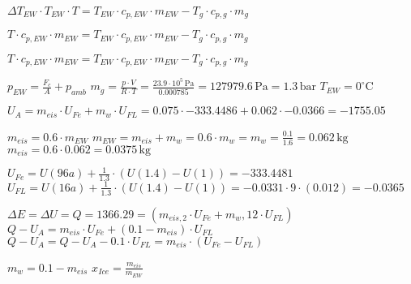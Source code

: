 \( \Delta T_{EW} \cdot T_{EW} \cdot T = T_{EW} \cdot c_{p,EW} \cdot m_{EW} - T_{g} \cdot c_{p,g} \cdot m_g \)  

\( T \cdot c_{p,EW} \cdot m_{EW} = T_{EW} \cdot c_{p,EW} \cdot m_{EW} - T_{g} \cdot c_{p,g} \cdot m_g \)  

\( T \cdot c_{p,EW} \cdot m_{EW} = T_{EW} \cdot c_{p,EW} \cdot m_{EW} - T_{g} \cdot c_{p,g} \cdot m_g \)

\( p_{EW} = \frac{F_c}{A} + p_{amb} \)  
\( m_g = \frac{p \cdot V}{R \cdot T} = \frac{23.9 \cdot 10^5 \, \text{Pa}}{0.000785} = 127979.6 \, \text{Pa} = 1.3 \, \text{bar} \)  
\( T_{EW} = 0^\circ \text{C} \)  

\( U_A = m_{eis} \cdot U_{Fe} + m_w \cdot U_{FL} = 0.075 \cdot -333.4486 + 0.062 \cdot -0.0366 = -1755.05 \)  

\( m_{eis} = 0.6 \cdot m_{EW} \)  
\( m_{EW} = m_{eis} + m_w = 0.6 \cdot m_w = m_w = \frac{0.1}{1.6} = 0.062 \, \text{kg} \)  
\( m_{eis} = 0.6 \cdot 0.062 = 0.0375 \, \text{kg} \)  

\( U_{Fe} = U(96a) + \frac{1}{1.3} \cdot (U(1.4) - U(1)) = -333.4481 \)  
\( U_{FL} = U(16a) + \frac{1}{1.3} \cdot (U(1.4) - U(1)) = -0.0331 \cdot 9 \cdot (0.012) = -0.0365 \)  

\( \Delta E = \Delta U = Q = 1366.29 = (m_{eis,2} \cdot U_{Fe} + m_w,12 \cdot U_{FL}) \)  
\( Q - U_A = m_{eis} \cdot U_{Fe} + (0.1 - m_{eis}) \cdot U_{FL} \)  
\( Q - U_A = Q - U_A - 0.1 \cdot U_{FL} = m_{eis} \cdot (U_{Fe} - U_{FL}) \)  

\( m_w = 0.1 - m_{eis} \)  
\( x_{Ice} = \frac{m_{eis}}{m_{EW}} \)